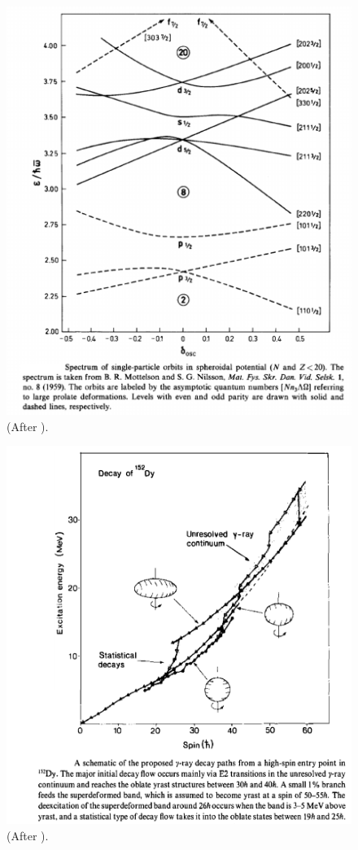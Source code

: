 \documentclass[a4paper,11pt]{book}
\numberwithin{equation}{section}
\numberwithin{figure}{section}
\numberwithin{table}{section}
\begin{document}
\begin{figure}
	\centerline {
		\includegraphics*[width=12cm, angle=0.]{introduccion/figs/fig0_4_2_v2}
	}
	\caption{(After \cite{Bohr:75}).}
	\label{fig0.4.1}
\end{figure}
\begin{figure}
	\centerline {
		\includegraphics*[width=12cm, angle=0.]{introduccion/figs/fig0_4_3_v2}
	}
	\caption{(After \cite{Nolan:88}).}
	\label{fig0.4.2}
\end{figure}
\end{document}
